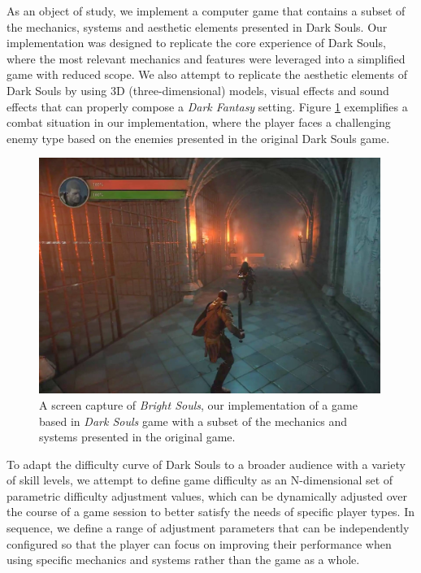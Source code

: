 As an object of study, we implement a computer game that contains a subset of the mechanics, systems and aesthetic elements presented in Dark Souls. Our implementation was designed to replicate the core experience of Dark Souls, where the most relevant mechanics and features were leveraged into a simplified game with reduced scope. We also attempt to replicate the aesthetic elements of Dark Souls by using 3D (three-dimensional) models, visual effects and sound effects that can properly compose a \emph{Dark Fantasy} setting. Figure \ref{fig:implementation-bright-souls} exemplifies a combat situation in our implementation, where the player faces a challenging enemy type based on the enemies presented in the original Dark Souls game.

\begin{figure}[!ht]
    \caption{A screen capture of \emph{Bright Souls}, our implementation of a game based in \emph{Dark Souls} game with a subset of the mechanics and systems presented in the original game.}
    \begin{center}
        \includegraphics[width=30em]{figures/fig-bright-souls.jpg}
    \end{center}
    \label{fig:implementation-bright-souls}
\end{figure}

To adapt the difficulty curve of Dark Souls to a broader audience with a variety of skill levels, we attempt to define game difficulty as an N-dimensional set of parametric difficulty adjustment values, which can be dynamically adjusted over the course of a game session to better satisfy the needs of specific player types. In sequence, we define a range of adjustment parameters that can be independently configured so that the player can focus on improving their performance when using specific mechanics and systems rather than the game as a whole.

